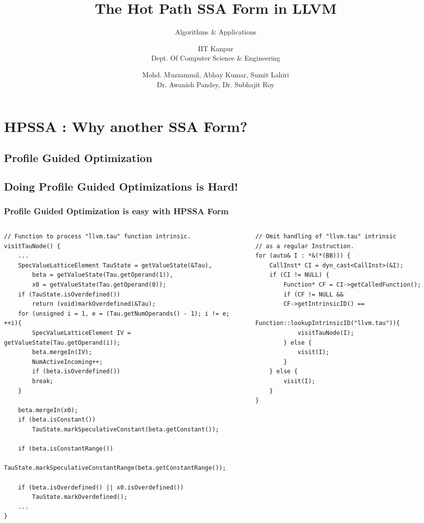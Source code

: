 \documentclass[aspectratio=169, compress]{beamer}
\title[\url{https://dl.acm.org/doi/10.1145/3078659.3078660}] %
{The Hot Path SSA Form in LLVM}
\subtitle{Algorithms \& Applications}
\author[Profile Guided Optimizations using HPSSA Form in LLVM] %
{IIT Kanpur \\ Dept. Of Computer Science \& Engineering}
\institute[IDK] %
{
	\inst{1}%
	IIT Kanpur\\
	PRAISE Group
}
\date[01/03/2022] %
{Mohd. Muzzammil, Abhay Kumar, Sumit Lahiri \\ Dr. Awanish Pandey, Dr. Subhajit Roy}
\begin{document}
\frame{\titlepage}

\footnotesize
\section{HPSSA : Why another SSA Form?}
\subsection{Profile Guided Optimization}
{
	
}
\subsection{Doing Profile Guided Optimizations is Hard!}
{
	
}
\begin{frame}[fragile]
	\frametitle{Profile Guided Optimization is easy with HPSSA Form}
	\begin{columns}
		\begin{column}{0.5\textwidth}
	\begin{verbatim}
// Function to process "llvm.tau" function intrinsic.
visitTauNode() {
	...
	SpecValueLatticeElement TauState = getValueState(&Tau), 
		beta = getValueState(Tau.getOperand(1)), 
		x0 = getValueState(Tau.getOperand(0));
	if (TauState.isOverdefined())
		return (void)markOverdefined(&Tau);
	for (unsigned i = 1, e = (Tau.getNumOperands() - 1); i != e; ++i){
		SpecValueLatticeElement IV = getValueState(Tau.getOperand(i));
		beta.mergeIn(IV);
		NumActiveIncoming++;
		if (beta.isOverdefined())
		break;
	}
	
	beta.mergeIn(x0);
	if (beta.isConstant())
		TauState.markSpeculativeConstant(beta.getConstant());
	
	if (beta.isConstantRange())
		TauState.markSpeculativeConstantRange(beta.getConstantRange());
	
	if (beta.isOverdefined() || x0.isOverdefined())
		TauState.markOverdefined();
	...
}
\end{verbatim}
		\end{column}
	\begin{column}{0.01\textwidth} \end{column}
		\begin{column}{0.4\textwidth}  
			\begin{verbatim}
// Omit handling of "llvm.tau" intrinsic 
// as a regular Instruction.
for (auto& I : *&(*(BB))) {
	CallInst* CI = dyn_cast<CallInst>(&I);
	if (CI != NULL) {
		Function* CF = CI->getCalledFunction();
		if (CF != NULL &&
		CF->getIntrinsicID() == 
			Function::lookupIntrinsicID("llvm.tau")){
			visitTauNode(I);
		} else {
			visit(I);
		} 
	} else {
		visit(I);
	}
}
			\end{verbatim}
		\end{column}
	\end{columns}
\end{frame}
\end{document}
